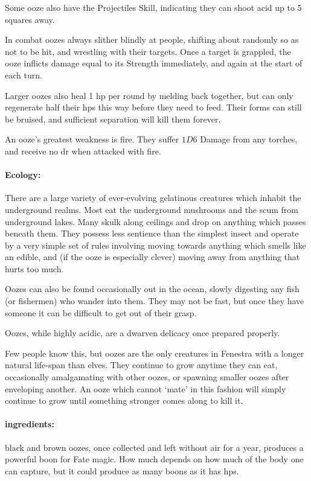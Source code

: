 \begin{multicols}{2}
Some ooze also have the Projectiles Skill, indicating they can shoot acid up to 5 squares away.

In combat oozes always slither blindly at people, shifting about randomly so as not to be hit, and wrestling with their targets.
Once a target is grappled, the ooze inflicts damage equal to its Strength immediately, and again at the start of each turn.

Larger oozes also heal 1 \gls{hp} per round by melding back together, but can only regenerate half their \glspl{hp} this way before they need to feed.
Their forms can still be bruised, and sufficient separation will kill them forever.

An ooze's greatest weakness is fire.
They suffer $1D6$ Damage from any torches, and receive no \gls{dr} when attacked with fire.

\paragraph{Ecology:} There are a large variety of ever-evolving gelatinous creatures which inhabit the underground realms.
Most eat the underground mushrooms and the scum from underground lakes.
Many skulk along ceilings and drop on anything which passes beneath them.
They possess less sentience than the simplest insect and operate by a very simple set of rules involving moving towards anything which smells like an edible, and (if the ooze is especially clever) moving away from anything that hurts too much.

Oozes can also be found occasionally out in the ocean, slowly digesting any fish (or fishermen) who wander into them.
They may not be fast, but once they have someone it can be difficult to get out of their grasp.

Oozes, while highly acidic, are a dwarven delicacy once prepared properly.

Few people know this, but oozes are the only creatures in Fenestra with a longer natural life-span than elves.
They continue to grow anytime they can eat, occasionally amalgamating with other oozes, or spawning smaller oozes after enveloping another.
An ooze which cannot `mate' in this fashion will simply continue to grow until something stronger comes along to kill it.

\jelly

\paragraph{\Glspl{ingredient}:}
black and brown oozes, once collected and left without air for a year, produces a powerful \gls{boon} for Fate magic.
How much depends on how much of the body one can capture, but it could produce as many \glspl{boon} as it has \glspl{hp}.


\end{multicols}
